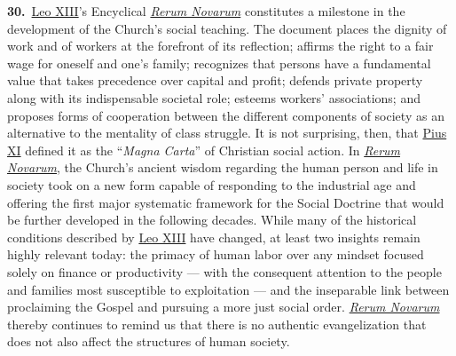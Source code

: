 \documentclass{article}
\begin{document}
\textbf{30.}\ \href{https://www.vatican.va/content/leo-xiii/en.html}{Leo XIII}'s Encyclical \href{https://www.vatican.va/content/leo-xiii/en/encyclicals/documents/hf_l-xiii_enc_15051891_rerum-novarum.html}{\emph{Rerum Novarum}} constitutes a milestone in the development of the Church's social teaching. The document places the dignity of work and of workers at the forefront of its reflection; affirms the right to a fair wage for oneself and one's family; recognizes that persons have a fundamental value that takes precedence over capital and profit; defends private property along with its indispensable societal role; esteems workers' associations; and proposes forms of cooperation between the different components of society as an alternative to the mentality of class struggle. It is not surprising, then, that \href{https://www.vatican.va/content/pius-xi/en.html}{Pius XI} defined it as the ``\emph{Magna Carta}''\cite{n25} of Christian social action. In \href{https://www.vatican.va/content/leo-xiii/en/encyclicals/documents/hf_l-xiii_enc_15051891_rerum-novarum.html}{\emph{Rerum Novarum}}, the Church's ancient wisdom regarding the human person and life in society took on a new form capable of responding to the industrial age and offering the first major systematic framework for the Social Doctrine that would be further developed in the following decades. While many of the historical conditions described by \href{https://www.vatican.va/content/leo-xiii/en.html}{Leo XIII} have changed, at least two insights remain highly relevant today: the primacy of human labor over any mindset focused solely on finance or productivity --- with the consequent attention to the people and families most susceptible to exploitation --- and the inseparable link between proclaiming the Gospel and pursuing a more just social order. \href{https://www.vatican.va/content/leo-xiii/en/encyclicals/documents/hf_l-xiii_enc_15051891_rerum-novarum.html}{\emph{Rerum Novarum}} thereby continues to remind us that there is no authentic evangelization that does not also affect the structures of human society.
\end{document}
